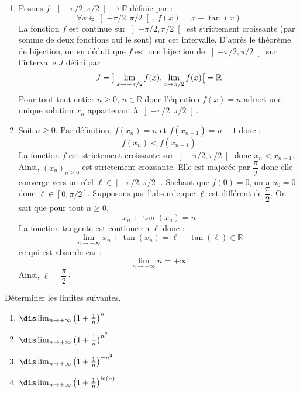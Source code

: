 \documentclass[a4paper,10pt]{report}
\begin{document}
\begin{enumerate}
\item Posons $f : \left] { - \pi  / 2,\pi  / 2} \right[ \rightarrow \mathbb{R}$ définie par :
$$ \forall x \in \left] { - \pi  / 2,\pi  / 2} \right[, \, f(x) = x+ \tan(x)$$
La fonction $f$ est continue sur $\left] { - \pi  / 2,\pi  / 2} \right[$ est strictement croissante (par somme de deux fonctions qui le sont) sur cet intervalle. D'après le théorème de bijection, on en déduit que $f$ est une bijection de $\left] { - \pi  / 2,\pi  / 2} \right[$ sur l'intervalle $J$ défini par :
$$ J = \big{]} \lim_{x \rightarrow - \pi/2} f(x), \lim_{x \rightarrow \pi/2} f(x) \big{[} = \mathbb{R}$$
Pour tout tout entier $n \geq 0$, $n \in \mathbb{R}$ donc l'équation $f(x)=n$ admet une unique solution $x_n$ appartenant à $\left] { - \pi  / 2,\pi  / 2} \right[$.
\item Soit $n \geq 0$. Par définition, $f(x_n) =n$ et $f(x_{n+1})=n+1$ donc :
$$ f(x_n) < f(x_{n+1})$$
La fonction $f$ est strictement croissante sur $\left] { - \pi  / 2,\pi  / 2} \right[$ donc $x_n < x_{n+1}$. Ainsi, $(x_n)_{n \geq 0}$ est strictement croissante. Elle est majorée par $\dfrac{\pi}{2}$ donc elle converge vers un réel $\ell \in \left[ { - \pi  / 2,\pi  / 2} \right]$. Sachant que $f(0)=0$, on a $u_0=0$ donc $\ell \in \left[ {0,\pi  / 2} \right]$. Supposons par l'absurde que $\ell$ est différent de $\dfrac{\pi}{2}$. On sait que pour tout $n \geq 0$,
$$ x_n + \tan(x_n) = n$$
La fonction tangente est continue en $\ell$ donc :
$$ \lim_{n \rightarrow + \infty} x_n + \tan(x_n) = \ell + \tan(\ell) \in \mathbb{R}$$
ce qui est absurde car :
$$ \lim_{n \rightarrow + \infty} n = + \infty$$
Ainsi, $\ell = \dfrac{\pi}{2}\cdot$
\end{enumerate}
\medskip

\begin{Exa} Déterminer les limites suivantes. 

\begin{multicols}{2}
\begin{enumerate}
\item $\dis \lim_{n \rightarrow + \infty} \left(1+ \frac{1}{n}\right)^n$
\item $\dis \lim_{n \rightarrow + \infty} \left(1+ \frac{1}{n}\right)^{n^2}$
\columnbreak
\item $\dis \lim_{n \rightarrow + \infty} \left(1+ \frac{1}{n}\right)^{-n^2}$
\item $\dis \lim_{n \rightarrow + \infty} \left(1+ \frac{1}{n}\right)^{\ln(n)}$
\end{enumerate}
\end{multicols}
\vspace{0.1cm}
\end{Exa} 
\end{document}
